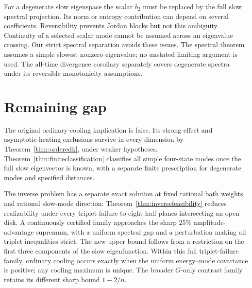 \documentclass[11pt]{article}
\begin{document}
For a degenerate slow eigenspace the scalar $b_2$ must be replaced by the full slow spectral projection. Its norm or entropy contribution can depend on several coefficients. Reversibility prevents Jordan blocks but not this ambiguity. Continuity of a selected scalar mode cannot be assumed across an eigenvalue crossing. Our strict spectral separation avoids these issues. The spectral theorem assumes a simple slowest nonzero eigenvalue; no unstated limiting argument is used. The all-time divergence corollary separately covers degenerate spectra under its reversible monotonicity assumptions.

\section{Remaining gap}
The original ordinary-cooling implication is false. Its strong-effect and asymptotic-heating exclusions survive in every dimension by Theorem~\ref{thm:orderedk}, under weaker hypotheses. Theorem~\ref{thm:finiteclassification} classifies all simple four-state modes once the full slow eigenvector is known, with a separate finite prescription for degenerate modes and specified distances.

The inverse problem has a separate exact solution at fixed rational bath weights and rational slow-mode direction: Theorem~\ref{thm:inversefeasibility} reduces realizability under every triplet failure to eight half-planes intersecting an open disk. A continuously certified family approaches the sharp $25\%$ amplitude-advantage supremum, with a uniform spectral gap and a perturbation making all triplet inequalities strict. The new upper bound follows from a restriction on the first three components of the slow eigenfunction. Within this full triplet-failure family, ordinary cooling occurs exactly when the uniform energy--mode covariance is positive; any cooling maximum is unique. The broader $G$-only contrast family retains its different sharp bound $1-2/n$.
\end{document}

